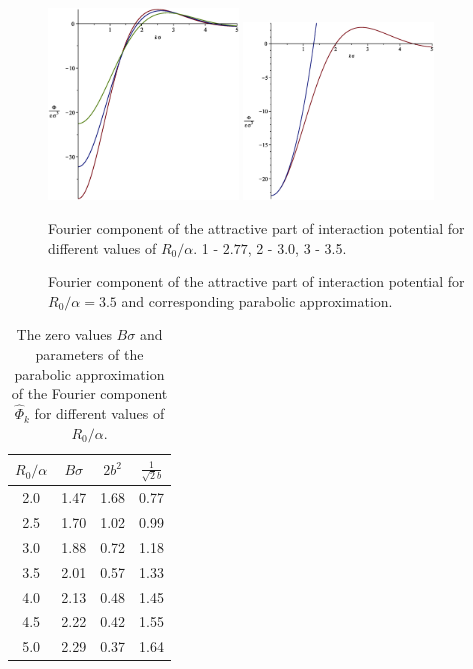 \begin{figure}[htbp]
	\includegraphics[width=0.45\textwidth,angle=0]{fourier_for_different_parameter_values} \hfill
	\includegraphics[width=0.45\textwidth,angle=0]{fourier_and_parabolic_potential} \\
	\parbox{0.5\textwidth}{\caption{\label{fig:fourier_for_some_parameter_values} Fourier component of the attractive part of interaction potential for different values of $R_0/\alpha$. 1 - $2.77$, 2 - 3.0, 3 - 3.5.
	}} \hfill
	\parbox{0.45\textwidth}{\caption{\label{fig:fourier_and_parabolic} Fourier component of the attractive part of interaction potential for $R_0/\alpha=3.5$ and corresponding parabolic approximation.
	}}
\end{figure}

\begin{table}[h]
	\caption{The zero values $B\sigma$ and parameters of the parabolic approximation of the Fourier component $\hat{\Phi}_{k}$ for different values of $R_0/\alpha$.}
	\label{tab:potential_fourier_zeros}
	\begin{center}
		\begin{tabular}{|c|c|c|c|}
			\hline
			$R_0/\alpha$ \quad & $B\sigma$ \quad & $2b^2$ \quad & $ \frac{1}{\sqrt{2}b}$ \quad \\
			\hline
			2.0  & 1.47 & 1.68 & 0.77 \\
			2.5  & 1.70 & 1.02 & 0.99 \\
			3.0  & 1.88 & 0.72 & 1.18 \\
			3.5  & 2.01 & 0.57 & 1.33 \\
			4.0  & 2.13 & 0.48 & 1.45 \\
			4.5  & 2.22 & 0.42 & 1.55 \\
			5.0  & 2.29 & 0.37 & 1.64 \\
			\hline
		\end{tabular}
	\end{center}
\end{table}

